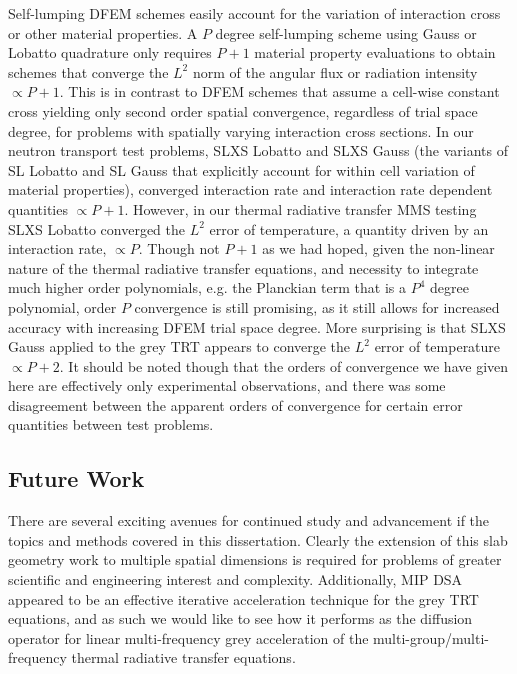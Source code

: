 Self-lumping DFEM schemes easily account for the variation of interaction cross or other material properties.
A $P$ degree self-lumping scheme using Gauss or Lobatto quadrature only requires $P+1$ material property evaluations to obtain schemes that converge the $L^2$ norm of the angular flux or radiation intensity $\propto P+1$.
This is in contrast to DFEM schemes that assume a cell-wise constant cross yielding only second order spatial convergence, regardless of trial space degree, for problems with spatially varying interaction cross sections.
In our neutron transport test problems, SLXS Lobatto and SLXS Gauss (the variants of SL Lobatto and SL Gauss that explicitly account for within cell variation of material properties), converged interaction rate and interaction rate dependent quantities $\propto P+1$.
However, in our thermal radiative transfer MMS testing SLXS Lobatto converged the $L^2$ error of temperature, a quantity driven by an interaction rate, $\propto P$.
Though not $P+1$ as we had hoped, given the non-linear nature of the thermal radiative transfer equations, and necessity to integrate much higher order polynomials, e.g. the Planckian term that is a $P^4$ degree polynomial, order $P$ convergence is still promising, as it still allows for increased accuracy with increasing DFEM trial space degree.
More surprising is that SLXS Gauss applied to the grey TRT appears to converge the $L^2$ error of temperature $\propto P+2$.
It should be noted though that the orders of convergence we have given here are effectively only experimental observations, and there was some disagreement between the apparent orders of convergence for certain error quantities between test problems.

\subsection{Future Work}

There are several exciting avenues for continued study and advancement if the topics and methods covered in this dissertation.
Clearly the extension of this slab geometry work to multiple spatial dimensions is required for problems of greater scientific and engineering interest and complexity.
Additionally, MIP DSA appeared to be an effective iterative acceleration technique for the grey TRT equations, and as such we would like to see how it performs as the diffusion operator for linear multi-frequency grey acceleration of the multi-group/multi-frequency thermal radiative transfer equations.

